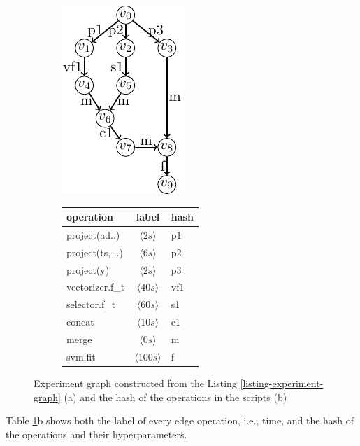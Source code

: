\begin{figure}
\begin{subfigure}[b]{0.4\linewidth}
\centering
\includegraphics[width=0.8\linewidth]{../images/tikz-standalone/example-graph}
\caption{}
\end{subfigure}%
\begin{subfigure}[b]{0.6\linewidth}
\begin{tabular}{lcl}
\hline
operation & label &  hash \\
\hline
project(ad..) & $\langle 2s\rangle$ &p1 \\
project(ts, ..) & $\langle 6s\rangle$ & p2\\
project(y) & $\langle 2s\rangle$ & p3\\
vectorizer.f\_t & $\langle 40s\rangle$ & vf1 \\
selector.f\_t & $\langle 60s\rangle$ & s1 \\
concat & $\langle 10s\rangle$ & c1 \\
merge & $\langle 0s\rangle$ & m\\
svm.fit & $\langle 100s\rangle$ & f\\
\hline
\end{tabular}
\caption{}
\end{subfigure}
\caption{Experiment graph constructed from the Listing \ref{listing-experiment-graph} (a) and the hash of the operations in the scripts (b)}
\label{fig-experiment-graph}
\end{figure}
Table \ref{fig-experiment-graph}b shows both the label of every edge operation, i.e., time, and the hash of the operations and their hyperparameters.

